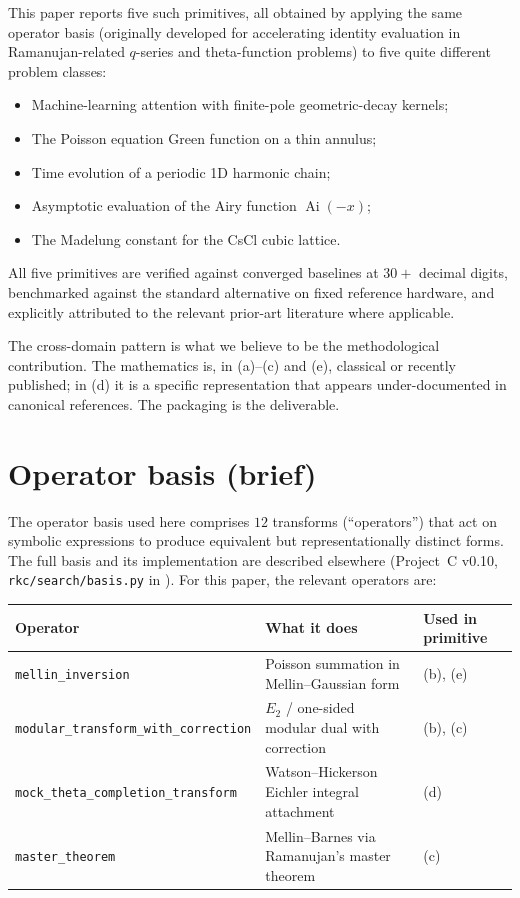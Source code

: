 \documentclass[11pt,reqno]{amsart}
\theoremstyle{definition}
\DeclareMathOperator{\Ai}{Ai}
\begin{document}
This paper reports five such primitives, all obtained by applying the
same operator basis (originally developed for accelerating identity
evaluation in Ramanujan-related $q$-series and theta-function problems)
to five quite different problem classes:
\begin{itemize}
\item Machine-learning attention with finite-pole geometric-decay
  kernels;
\item The Poisson equation Green function on a thin annulus;
\item Time evolution of a periodic 1D harmonic chain;
\item Asymptotic evaluation of the Airy function $\Ai(-x)$;
\item The Madelung constant for the CsCl cubic lattice.
\end{itemize}
All five primitives are verified against converged baselines at $30+$
decimal digits, benchmarked against the standard alternative on fixed
reference hardware, and explicitly attributed to the relevant prior-art
literature where applicable.

The cross-domain pattern is what we believe to be the methodological
contribution. The mathematics is, in (a)--(c) and (e), classical or
recently published; in (d) it is a specific representation that appears
under-documented in canonical references. The packaging is the
deliverable.

\section{Operator basis (brief)}\label{sec:basis}

The operator basis used here comprises $12$ transforms (``operators'')
that act on symbolic expressions to produce equivalent but
representationally distinct forms. The full basis and its
implementation are described elsewhere (Project~C v0.10,
\verb|rkc/search/basis.py| in \cite{ProjectC}). For this paper, the
relevant operators are:

\begin{center}
\begin{tabular}{lll}
\toprule
Operator & What it does & Used in primitive \\
\midrule
\texttt{mellin\_inversion} & Poisson summation in Mellin--Gaussian form & (b), (e) \\
\texttt{modular\_transform\_with\_correction} & $E_2$ / one-sided modular dual with correction & (b), (c) \\
\texttt{mock\_theta\_completion\_transform} & Watson--Hickerson Eichler integral attachment & (d) \\
\texttt{master\_theorem} & Mellin--Barnes via Ramanujan's master theorem & (c) \\
\bottomrule
\end{tabular}
\end{center}
\end{document}
